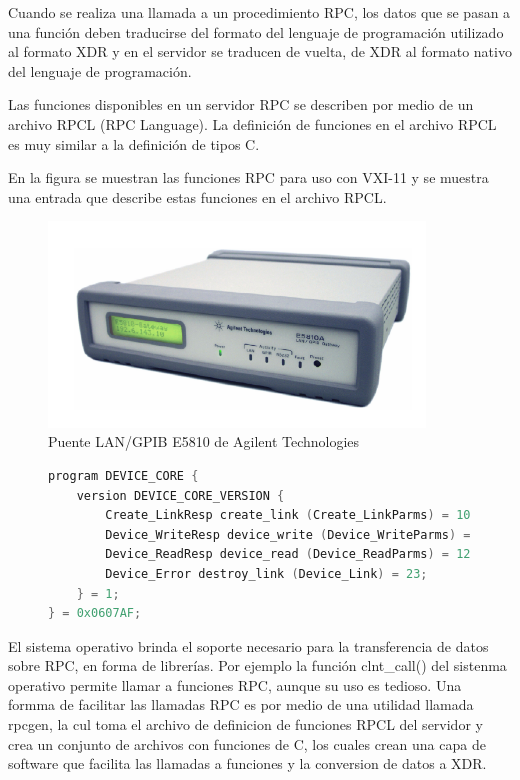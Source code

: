 \documentclass[paper=letter,oneside,fontsize=11pt, parskip=full]{scrartcl}
\begin{document}
		Cuando se realiza una llamada a un procedimiento RPC, los datos  que se pasan a una función deben traducirse del formato del lenguaje de programación utilizado al formato XDR y en el servidor se traducen de vuelta, de XDR al formato nativo del lenguaje de programación.
		
		Las funciones disponibles en un servidor RPC se describen por medio de un archivo RPCL (RPC Language). La definición de funciones en el archivo RPCL es muy similar a la definición de tipos  C.		
		
		En la figura se muestran las funciones RPC para uso con VXI-11 y se muestra una entrada que describe estas funciones en el archivo RPCL.
				
		\begin{figure}[!h]
			\begin{center}
				\includegraphics[width=10cm]{Imagenes/E5810.pdf}
				\caption{Puente LAN/GPIB E5810 de Agilent Technologies}
				\label{Fig:PuenteLanGpib}				
			\end{center}
		\end{figure}
	
		\begin{figure}
			\begin{lstlisting}[language=c]	
program DEVICE_CORE { 
	version DEVICE_CORE_VERSION { 
		Create_LinkResp create_link (Create_LinkParms) = 10; 
		Device_WriteResp device_write (Device_WriteParms) = 11; 
		Device_ReadResp device_read (Device_ReadParms) = 12; 
		Device_Error destroy_link (Device_Link) = 23; 
	} = 1; 
} = 0x0607AF;	
			\end{lstlisting}
		\end{figure}
		
		El sistema operativo brinda el soporte necesario para la transferencia de datos sobre RPC, en forma de librerías. Por ejemplo la función clnt\_call() del sistenma operativo permite llamar a funciones RPC, aunque su uso es tedioso. Una formma de facilitar las llamadas RPC es por medio de una utilidad llamada rpcgen, la cul toma el archivo de definicion de funciones RPCL del servidor y crea un conjunto de archivos con funciones de C, los cuales crean una capa de software que facilita las llamadas a funciones y la conversion de datos a XDR.
		
\end{document}
